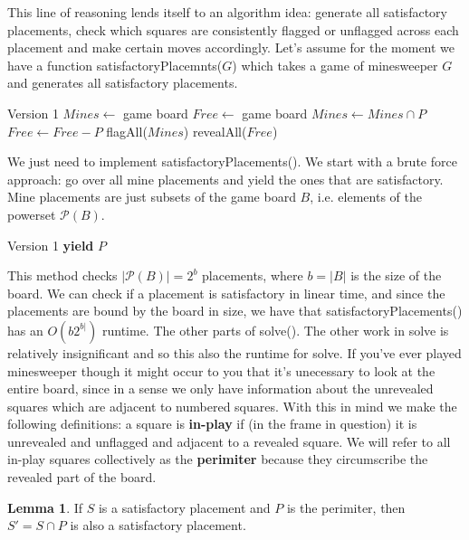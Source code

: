\documentclass{article}
\theoremstyle{definition}
\theoremstyle{definition}
\theoremstyle{theorem}
\newtheorem*{lemma}{Lemma}
\begin{document}
	This line of reasoning lends itself to an algorithm idea: generate all satisfactory placements, check which squares are consistently flagged or unflagged across each placement and make certain moves accordingly. Let's assume for the moment we have a function satisfactoryPlacemnts($G$) which takes a game of minesweeper $G$ and generates all satisfactory placements.
	
	\begin{algorithmic}
		 \Comment Version 1
		\State $Mines \gets$ game board
		\State $Free \gets$ game board
		\State $Mines \gets Mines \cap P$
		\State $Free \gets Free -  P$
		\EndFor
		\State flagAll($Mines$)
		\State revealAll($Free$)
		\EndFunction
	\end{algorithmic}
	
	We just need to implement satisfactoryPlacements(). We start with a brute force approach: go over all mine placements and yield the ones that are satisfactory. Mine placements are just subsets of the game board $B$, i.e. elements of the powerset $\mathcal{P}(B)$.
	
	\begin{algorithmic}
		 \Comment Version 1
		\For{$P$ in $\mathcal{P}(B)$}
		\If{$P$ is satisfactory}
		\State \textbf{yield} $P$
		\EndIf
		\EndFor
		\EndFunction
	\end{algorithmic}
	
	This method checks $|\mathcal{P}(B)| = 2^{b}$ placements, where $b = |B|$ is the size of the board. We can check if a placement is satisfactory in linear time, and since the placements are bound by the board in size, we have that satisfactoryPlacements() has an $O(b2^{b|})$ runtime. The other parts of solve(). The other work in solve is relatively insignificant and so this also the runtime for solve. If you've ever played minesweeper though it might occur to you that it's unecessary to look at the entire board, since in a sense we only have information about the unrevealed squares which are adjacent to numbered squares. With this in mind we make the following definitions: a square is \textbf{in-play} if (in the frame in question) it is unrevealed and unflagged and adjacent to a revealed square. We will refer to all in-play squares collectively as the \textbf{perimiter} because they circumscribe the revealed part of the board.
	
	\begin{lemma}
		If $S$ is a satisfactory placement and $P$ is the perimiter,  then $S' = S \cap P$ is also a satisfactory placement.
	\end{lemma}
\end{document}
